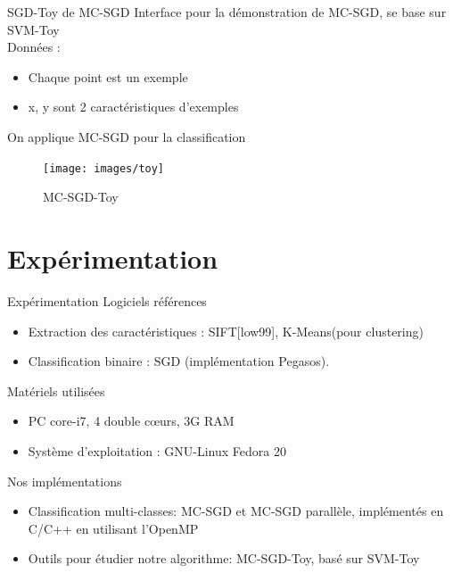 \documentclass[11pt]{beamer}
\begin{document}
\begin{otherlanguage}{french}
\begin{frame}{SGD-Toy de MC-SGD}
Interface pour la démonstration de MC-SGD, se base sur SVM-Toy\cite{cl01}\\
Données :
\begin{itemize}
\item Chaque point est un exemple
\item x, y sont 2 caractéristiques d'exemples
\end{itemize}
On applique MC-SGD pour la classification

\begin{figure}[ht!]
\centering
\texttt{[image: images/toy]}
\caption{MC-SGD-Toy}
\label{fig:toy}
\end{figure}
\end{frame}



\section{Expérimentation}
\begin{frame}{Expérimentation}
Logiciels références
\begin{itemize}
\item Extraction des caractéristiques : SIFT[low99], K-Means(pour clustering)
\item Classification binaire : SGD (implémentation Pegasos).
\end{itemize}
Matériels utilisées
\begin{itemize}
\item PC core-i7, 4 double cœurs, 3G RAM
\item Système d'exploitation : GNU-Linux Fedora 20
\end{itemize}
\pause
Nos implémentations
\begin{itemize}
\pause
\item Classification multi-classes: MC-SGD et MC-SGD parallèle, implémentés en C/C++ en utilisant l'OpenMP
\pause
\item Outils pour étudier notre algorithme: MC-SGD-Toy, basé sur SVM-Toy\cite{cl01}
\end{itemize}
\end{frame}


\end{otherlanguage}
\end{document}
